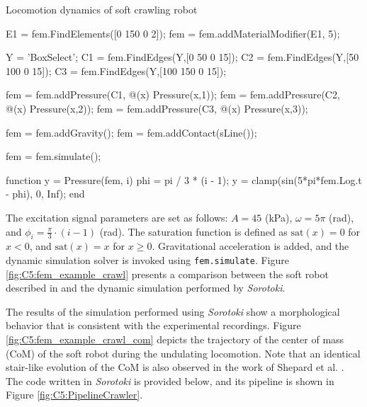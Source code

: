 \begin{example}{Locomotion dynamics of soft crawling robot}
\begin{matlabcode}
E1  = fem.FindElements([0 150 0 2]);
fem = fem.addMaterialModifier(E1, 5);

Y  = 'BoxSelect';
C1 = fem.FindEdges(Y,[0   50 0 15]);
C2 = fem.FindEdges(Y,[50  100 0 15]);
C3 = fem.FindEdges(Y,[100 150 0 15]);

fem = fem.addPressure(C1, @(x) Pressure(x,1));
fem = fem.addPressure(C2, @(x) Pressure(x,2));
fem = fem.addPressure(C3, @(x) Pressure(x,3));

fem = fem.addGravity();
fem = fem.addContact(sLine());

fem = fem.simulate();

function y = Pressure(fem, i)
    phi = pi / 3 * (i - 1);
    y = clamp(sin(5*pi*fem.Log.t - phi), 0, Inf);
end
\end{matlabcode}

The excitation signal parameters are set as follows: $A = 45$ (\si{\kilo \pascal}), $\omega = 5 \pi$ (\si{\radian}), and $\phi_i = \frac{\pi}{3} \cdot (i-1)$ (\si{\radian}). The saturation function is defined as $\textrm{sat}(x) = 0$ for $x < 0$, and $\textrm{sat}(x) = x$ for $x \geq 0$. Gravitational acceleration is added, and the dynamic simulation solver is invoked using \texttt{fem.simulate}. Figure \ref{fig:C5:fem_example_crawl} presents a comparison between the soft robot described in \cite{Shepherd2011Dec} and the dynamic simulation performed by \textit{Sorotoki}.

The results of the simulation performed using \textit{Sorotoki} show a morphological behavior that is consistent with the experimental recordings. Figure \ref{fig:C5:fem_example_crawl_com} depicts the trajectory of the center of mass (CoM) of the soft robot during the undulating locomotion. Note that an identical stair-like evolution of the CoM is also observed in the work of Shepard et al. \cite{Shepherd2011Dec}. The code written in \textit{Sorotoki} is provided below, and its pipeline is shown in Figure \ref{fig:C5:PipelineCrawler}.
\end{example}

%

